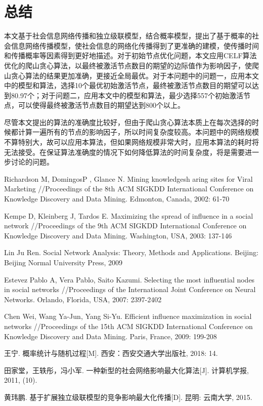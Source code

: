\documentclass[UTF8]{ctexart}
\begin{document}
\newpage
\section{总结}
本文基于社会信息网络传播和独立级联模型，结合概率模型，提出了基于概率的社会信息网络传播模型，使社会信息的网络化传播得到了更准确的建模，使传播时间和传播概率等因素得到更好地描述。对于初始节点优化问题，本文应用CELF算法优化的爬山贪心算法，以最终被激活节点数目的期望的边际值作为影响因子，使爬山贪心算法的结果更加准确，更接近全局最优。对于本问题中的问题一，应用本文中的模型和算法，选择10个最优初始激活节点，最终被激活节点数目的期望可以达到80.97个；对于问题二，应用本文中的模型和算法，最少选择557个初始激活节点，可以使得最终被激活节点数目的期望达到800个以上。

尽管本文提出的算法的准确度比较好，但由于爬山贪心算法本质上在每次选择的时候都计算一遍所有的节点的影响因子，所以时间复杂度较高。本问题中的网络规模不算特别大，故可以应用本算法，但如果网络规模非常大时，应用本算法的耗时将无法接受。在保证算法准确度的情况下如何降低算法的时间复杂度，将是需要进一步讨论的问题。




\newpage
\begin{thebibliography}{}
	Richardson M, DomingosP , Glance N. Mining knowledgesh
	aring sites for Viral Marketing //Proceedings of the 8th
	ACM SIGKDD International Conference on Knowledge Discovery
	and Data Mining. Edmonton, Canada, 2002: 61-70
	
	Kempe D, Kleinberg J, Tardos E. Maximizing the spread of
	influence in a social network //Proceedings of the 9th ACM
	SIGKDD International Conference on Knowledge Discovery
	and Data Mining. Washington, USA, 2003: 137-146
	
	Lin Ju Ren. Social Network Analysis: Theory, Methods and
	Applications. Beijing: Beijing Normal University Press, 2009
	
	Estevez Pablo A, Vera Pablo, Saito Kazumi. Selecting the
	most influential nodes in social networks //Proceedings of the
	International Joint Conference on Neural Networks. Orlando,
	Florida, USA, 2007: 2397-2402
	
	Chen Wei, Wang Ya-Jun, Yang Si-Yu. Efficient influence
	maximization in social networks //Proceedings of the 15th
	ACM SIGKDD International Conference on Knowledge Discovery
	and Data Mining. Paris, France, 2009: 199-208
	
	王宁. 概率统计与随机过程[M]. 西安：西安交通大学出版社, 2018: 14.
	
	田家堂，王轶彤，冯小军. 一种新型的社会网络影响最大化算法[J]. 计算机学报, 2011, (10).

	黄玮鹏. 基于扩展独立级联模型的竞争影响最大化传播[D]. 昆明: 云南大学, 2015.

\end{thebibliography}

\clearpage
\end{document}
